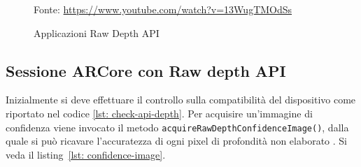 \documentclass[crop=false, class=book]{standalone}
\begin{document}
		\begin{figure}
				\centering
				{Fonte: \url{https://www.youtube.com/watch?v=13WugTMOdSs}}
				\caption{Applicazioni Raw Depth API }
				\label{fig: app-depth-raw-api}
		\end{figure}
		\subsection{Sessione ARCore con Raw depth API}
		
		Inizialmente si deve effettuare il controllo sulla compatibilità del dispositivo come riportato nel codice \vref{lst: check-api-depth}.
		Per acquisire un'immagine di confidenza viene invocato il metodo \verb|acquireRawDepthConfidenceImage()|, dalla quale si può ricavare l'accuratezza di ogni pixel di profondità non elaborato \cite{google2022rawdepth}. Si veda il listing~\vref{lst: confidence-image}.
		
\end{document}
